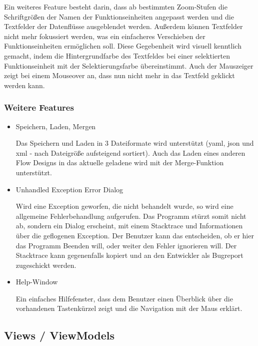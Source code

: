 	Ein weiteres Feature besteht darin, dass ab bestimmten Zoom-Stufen die
	Schriftgrößen der Namen der Funktionseinheiten angepasst werden und die 
	Textfelder der Datenflüsse ausgeblendet werden.
	Außerdem können Textfelder nicht mehr fokussiert werden, was ein einfacheres
	Verschieben der Funktionseinheiten ermöglichen soll. Diese Gegebenheit wird
	visuell kenntlich gemacht, indem die Hintergrundfarbe des Textfeldes bei
	einer selektierten Funktionseinheit mit der Selektierungsfarbe übereinstimmt.
	Auch der Mauszeiger zeigt bei einem Mouseover an, dass nun nicht mehr in
	das Textfeld geklickt werden kann.
	
	
	\subsubsection{Weitere Features}

	\begin{itemize}
		\item Speichern, Laden, Mergen
		
		Das Speichern und Laden in 3 Dateiformate wird unterstützt
		(yaml, json und xml - nach Dateigröße aufsteigend sortiert).
		Auch das Laden eines anderen Flow Designs in das aktuelle geladene wird 
		mit der Merge-Funktion unterstützt.

		\item Unhandled Exception Error Dialog
		
		Wird eine Exception geworfen, die nicht behandelt wurde, so wird eine
		allgemeine Fehlerbehandlung aufgerufen. Das Programm stürzt somit nicht ab,
		sondern ein Dialog erscheint, mit einem Stacktrace und Informationen
		über die geflogenen Exception. Der Benutzer kann das entscheiden, ob er
		hier das Programm Beenden will, oder weiter den Fehler ignorieren will.
		Der Stacktrace kann gegenenfalls kopiert und an den Entwickler als
		Bugreport zugeschickt werden.
		
		\item Help-Window
		
		Ein einfaches Hilfefenster, dass dem Benutzer einen Überblick über die
		vorhandenen Tastenkürzel zeigt und die Navigation mit der Maus erklärt.
	\end{itemize}
	



\subsection{Views / ViewModels}


